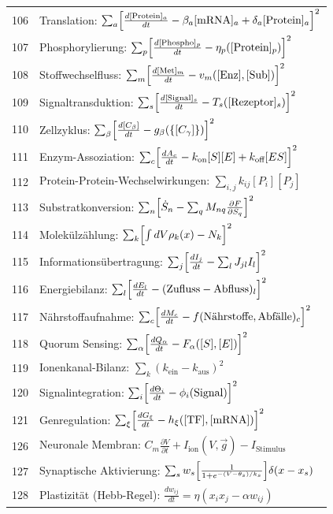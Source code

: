 \documentclass[11pt,a4paper]{article}
\begin{document}
\begin{longtable}{r l}
		106 & Translation: $\sum_a\Bigl[\frac{d[\text{Protein}]_a}{dt} - \beta_a[\text{mRNA}]_a + \delta_a[\text{Protein}]_a\Bigr]^2$ \\
		107 & Phosphorylierung: $\sum_p\Bigl[\frac{d[\text{Phospho}]_p}{dt} - \eta_p([\text{Protein}]_p)\Bigr]^2$ \\
		108 & Stoffwechselfluss: $\sum_m\Bigl[\frac{d[\text{Met}]_m}{dt} - v_m([\text{Enz}],[\text{Sub}])\Bigr]^2$ \\
		109 & Signaltransduktion: $\sum_s\Bigl[\frac{d[\text{Signal}]_s}{dt} - T_s([\text{Rezeptor}]_s)\Bigr]^2$ \\
		110 & Zellzyklus: $\sum_\beta\Bigl[\frac{d[C_\beta]}{dt} - g_\beta(\{[C_\gamma]\})\Bigr]^2$ \\
		111 & Enzym-Assoziation: $\sum_c\Bigl[\frac{dA_c}{dt} - k_{\text{on}}[S][E] + k_{\text{off}}[ES]\Bigr]^2$ \\
		112 & Protein-Protein-Wechselwirkungen: $\sum_{i,j}k_{ij}[P_i][P_j]$ \\
		113 & Substratkonversion: $\sum_n\Bigl[\dot S_n - \sum_q M_{nq}\frac{\partial F}{\partial S_q}\Bigr]^2$ \\
		114 & Molekülzählung: $\sum_k\Bigl[\int dV\rho_k(x) - N_k\Bigr]^2$ \\
		115 & Informationsübertragung: $\sum_j\Bigl[\frac{dI_j}{dt} - \sum_l J_{jl}I_l\Bigr]^2$ \\
		116 & Energiebilanz: $\sum_l\Bigl[\frac{dE_l}{dt} - (\text{Zufluss} - \text{Abfluss})_l\Bigr]^2$ \\
		117 & Nährstoffaufnahme: $\sum_c\Bigl[\frac{dM_c}{dt} - f(\text{Nährstoffe},\text{Abfälle})_c\Bigr]^2$ \\
		118 & Quorum Sensing: $\sum_\alpha\Bigl[\frac{dQ_\alpha}{dt} - F_\alpha([S],[E])\Bigr]^2$ \\
		119 & Ionenkanal-Bilanz: $\sum_k(k_{\text{ein}} - k_{\text{aus}})^2$ \\
		120 & Signalintegration: $\sum_i\Bigl[\frac{d\Theta_i}{dt} - \phi_i(\text{Signal})\Bigr]^2$ \\
		121 & Genregulation: $\sum_\xi\Bigl[\frac{dG_\xi}{dt} - h_\xi([\text{TF}],[\text{mRNA}])\Bigr]^2$ \\
		126 & Neuronale Membran: $C_m\frac{\partial V}{\partial t} + I_{\text{ion}}(V,\vec g) - I_{\text{Stimulus}}$ \\
		127 & Synaptische Aktivierung: $\sum_s w_s\Bigl[\frac{1}{1+e^{-(V-\theta_s)/k_s}}\Bigr]\delta(x-x_s)$ \\
		128 & Plastizität (Hebb-Regel): $\frac{dw_{ij}}{dt} = \eta(x_i x_j - \alpha w_{ij})$ \\

\end{longtable}
\end{document}
